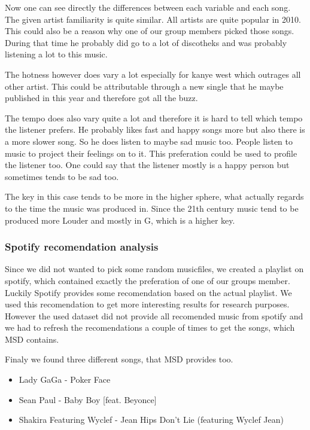 \documentclass[]{article}
\providecommand{\tightlist}{%
  \setlength{\itemsep}{0pt}\setlength{\parskip}{0pt}}
\begin{document}
Now one can see directly the differences between each variable and each
song. The given artist familiarity is quite similar. All artists are
quite popular in 2010. This could also be a reason why one of our group
members picked those songs. During that time he probably did go to a lot
of discotheks and was probably listening a lot to this music.

The hotness however does vary a lot especially for kanye west which
outrages all other artist. This could be attributable through a new
single that he maybe published in this year and therefore got all the
buzz.

The tempo does also vary quite a lot and therefore it is hard to tell
which tempo the listener prefers. He probably likes fast and happy songs
more but also there is a more slower song. So he does listen to maybe
sad music too. People listen to music to project their feelings on to
it. This preferation could be used to profile the listener too. One
could say that the listener mostly is a happy person but sometimes tends
to be sad too.

The key in this case tends to be more in the higher sphere, what
actually regards to the time the music was produced in. Since the 21th
century music tend to be produced more Louder and mostly in G, which is
a higher key.

\subsubsection{Spotify recomendation
analysis}\label{spotify-recomendation-analysis}

Since we did not wanted to pick some random musicfiles, we created a
playlist on spotify, which contained exactly the preferation of one of
our groups member. Luckily Spotify provides some recomendation based on
the actual playlist. We used this recomendation to get more interesting
results for research purposes. However the used dataset did not provide
all recomended music from spotify and we had to refresh the
recomendations a couple of times to get the songs, which MSD contains.

Finaly we found three different songs, that MSD provides too.

\begin{itemize}
\tightlist
\item
  Lady GaGa - Poker Face
\item
  Sean Paul - Baby Boy {[}feat. Beyonce{]}
\item
  Shakira Featuring Wyclef - Jean Hips Don't Lie (featuring Wyclef Jean)
\end{itemize}
\end{document}
